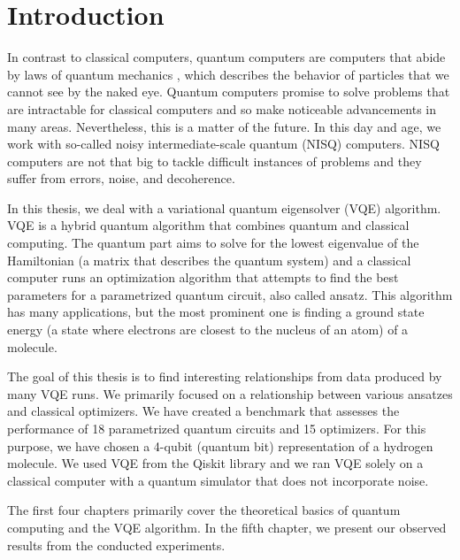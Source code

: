 \chapter*{Introduction}

In contrast to classical computers, quantum computers are computers that abide by laws of quantum mechanics , which describes the behavior of particles that we cannot see by the naked eye. Quantum computers promise to solve problems that are intractable for classical computers \cite{Peruzzo} and so make noticeable advancements in many areas. Nevertheless, this is a matter of the future. In this day and age, we work with so-called noisy intermediate-scale quantum (NISQ) computers. NISQ computers are not that big to tackle difficult instances of problems and they suffer from errors, noise, and decoherence.

In this thesis, we deal with a variational quantum eigensolver (VQE) algorithm. VQE is a hybrid quantum algorithm that combines quantum and classical computing. The quantum part aims to solve for the lowest eigenvalue  of the Hamiltonian (a matrix that describes the quantum system) and a classical computer runs an optimization algorithm that attempts to find the best parameters for a parametrized quantum circuit, also called ansatz. This algorithm has many applications, but the most prominent one is finding a ground state energy (a state where electrons are closest to the nucleus of an atom) of a molecule.

The goal of this thesis is to find interesting relationships from data produced by many VQE runs. We primarily focused on a relationship between various ansatzes and classical optimizers.  We have created a benchmark  that assesses the performance of 18 parametrized quantum circuits and 15 optimizers. For this purpose, we have chosen a 4-qubit (quantum bit) representation of a hydrogen molecule. We used VQE from the Qiskit library and we ran VQE solely on a classical computer with a quantum simulator that does not incorporate noise.


The first four chapters primarily cover the theoretical basics of quantum computing and the VQE algorithm. In the fifth chapter, we present our observed results from the conducted experiments.


